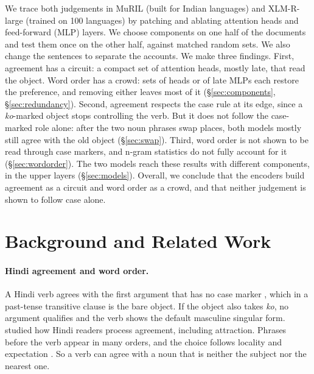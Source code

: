 \documentclass[11pt]{article}
\begin{document}
We trace both judgements in MuRIL (built for Indian languages) and XLM-R-large (trained on 100 languages) by patching and ablating attention heads and feed-forward (MLP) layers.
We choose components on one half of the documents and test them once on the other half, against matched random sets.
We also change the sentences to separate the accounts.
We make three findings.
First, agreement has a circuit: a compact set of attention heads, mostly late, that read the object.
Word order has a crowd: sets of heads or of late MLPs each restore the preference, and removing either leaves most of it (\S\ref{sec:components}, \S\ref{sec:redundancy}).
Second, agreement respects the case rule at its edge, since a \emph{ko}-marked object stops controlling the verb.
But it does not follow the case-marked role alone: after the two noun phrases swap places, both models mostly still agree with the old object (\S\ref{sec:swap}).
Third, word order is not shown to be read through case markers, and n-gram statistics do not fully account for it (\S\ref{sec:wordorder}).
The two models reach these results with different components, in the upper layers (\S\ref{sec:models}).
Overall, we conclude that the encoders build agreement as a circuit and word order as a crowd, and that neither judgement is shown to follow case alone.

\section{Background and Related Work}
\label{sec:background}

\paragraph{Hindi agreement and word order.}
A Hindi verb agrees with the first argument that has no case marker \citep{mohanan1994}, which in a past-tense transitive clause is the bare object.
If the object also takes \emph{ko}, no argument qualifies and the verb shows the default masculine singular form.
\citet{bhatia2022} studied how Hindi readers process agreement, including attraction.
Phrases before the verb appear in many orders, and the choice follows locality and expectation \citep{ranjan2022}.
So a verb can agree with a noun that is neither the subject nor the nearest one.
\end{document}
